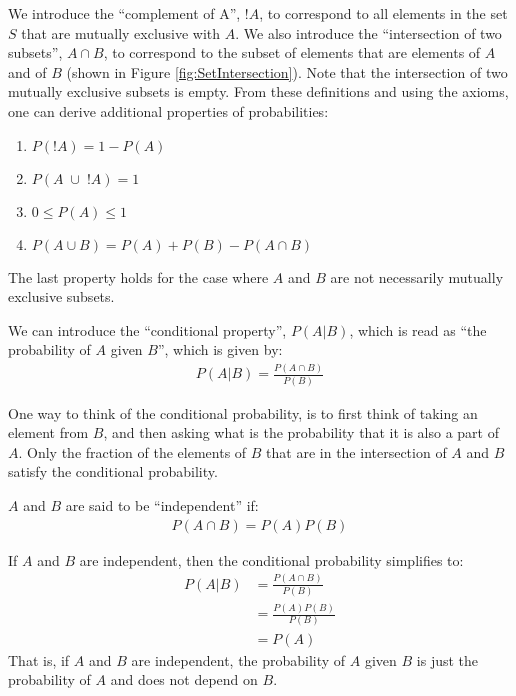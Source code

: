 We introduce the ``complement of A'', $!A$, to correspond to all elements in the set $S$ that are mutually exclusive with $A$. We also introduce the ``intersection of two subsets'', $A \cap B$, to correspond to the subset of elements that are elements of $A$ and of $B$ (shown in Figure \ref{fig:SetIntersection}). Note that the intersection of two mutually exclusive subsets is empty. From these definitions and using the axioms, one can derive additional properties of probabilities:
\begin{enumerate}[topsep=0pt,itemsep=-1ex,partopsep=1ex,parsep=1ex]
\item $P(!A) = 1 - P(A)$
\item $P(A\; \cup\; !A) =1$
\item $0\leq P(A) \leq 1$
\item $P(A \cup B) = P(A) + P(B) - P(A \cap B)$
\end{enumerate}
The last property holds for the case where $A$ and $B$ are not necessarily mutually exclusive subsets. 

We can introduce the ``conditional property'', $P(A|B)$, which is read as ``the probability of $A$ given $B$'', which is given by:
\begin{align}
\label{eqn:conditional}
P(A|B) = \frac{P(A \cap B)}{P(B)}
\end{align}

One way to think of the conditional probability, is to first think of taking an element from $B$, and then asking what is the probability that it is also a part of $A$. Only the fraction of the elements of $B$ that are in the intersection of $A$ and $B$ satisfy the conditional probability. 


$A$ and $B$ are said to be ``independent'' if:
\begin{align}
P(A \cap B) = P(A)P(B)
\end{align}

If $A$ and $B$ are independent, then the conditional probability simplifies to:
\begin{align}
P(A|B) &= \frac{P(A \cap B)}{P(B)} \nonumber\\
&=\frac{P(A)P(B)}{P(B)} \nonumber\\
&=P(A)
\end{align}
That is, if $A$ and $B$ are independent, the probability of $A$ given $B$ is just the probability of $A$ and does not depend on $B$.

